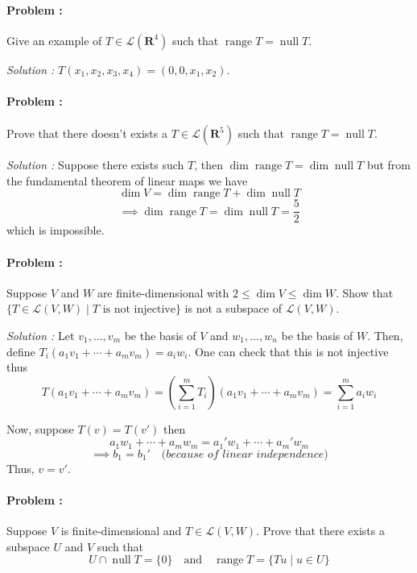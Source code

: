 \paragraph{Problem :} Give an example of $T \in \mathcal{L}(\mathbf{R}^4)$ such that $\operatorname{range} T = \operatorname{null} T$.

\vspace{4mm}
\textit{Solution :} $T(x_1,x_2,x_3,x_4)=(0,0,x_1,x_2)$.

\paragraph{Problem :} Prove that there doesn't exists a $T \in \mathcal{L}(\mathbf{R}^5)$ such that 
$\operatorname{range}T=\operatorname{null}T$.

\vspace{4mm}
\textit{Solution :} Suppose there exists such $T$, then $\dim \operatorname{range} T = \dim \operatorname{null} T$ but from the fundamental
theorem of linear maps we have 
\[ \dim V = \dim \operatorname{range} T + \dim \operatorname{null} T \]
\[ \implies \dim \operatorname{range} T = \dim \operatorname{null} T = \frac{5}{2} \]
which is impossible.


\paragraph{Problem :} Suppose $V$ and $W$ are finite-dimensional with $2 \le \dim V \le \dim W$. Show that 
$\{T \in \mathcal{L}(V,W) \mid T \text{ is not injective} \}$ is not a subspace of $\mathcal{L}(V,W)$.

\vspace{4mm}
\textit{Solution :} Let $v_1,\ldots,v_m$ be the basis of $V$ and $w_1,\ldots,w_n$ be the basis of $W$. 
Then, define $T_i(a_1 v_1 + \cdots + a_m v_m)=a_i w_i$. One can check that this is not injective thus
\[ T(a_1 v_1 + \cdots + a_m v_m)=\left( \sum_{i=1}^{m} T_i \right) (a_1 v_1 + \cdots + a_m v_m) = \sum_{i=1}^{m} a_i w_i \]

Now, suppose $T(v)=T(v')$ then
\[ a_1 w_1 + \cdots + a_m w_m = a_1' w_1 + \cdots + a_m' w_m \]
\[ \implies b_1=b_1' \quad \textit{(because of linear independence)} \]
Thus, $v=v'$.

\paragraph{Problem :} Suppose $V$ is finite-dimensional and $T \in \mathcal{L}(V,W)$. Prove that there exists a subspace $U$ and $V$ 
such that 
\[ U \cap \operatorname{null} T = \{0\} \quad \text{and} \quad \operatorname{range} T = \{Tu \mid u \in U\} \]

